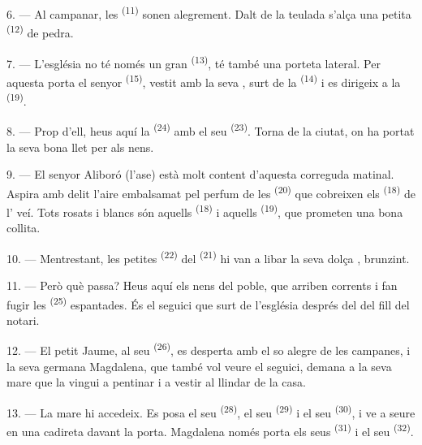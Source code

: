 6. --- Al campanar, les  \textsuperscript{(11)} sonen
alegrement. Dalt de la teulada s'alça una petita 
\textsuperscript{(12)} de pedra.

7. --- L'església no té només un gran  \textsuperscript{(13)}, té
també una porteta lateral. Per aquesta porta el senyor 
\textsuperscript{(15)}, vestit amb la seva , surt de la
 \textsuperscript{(14)} i es dirigeix a la 
\textsuperscript{(19)}.

8. --- Prop d'ell, heus aquí la  \textsuperscript{(24)} amb el seu
 \textsuperscript{(23)}. Torna de la ciutat, on ha portat la seva bona
llet per als nens.

\VUsaut{4.0mm}
\VUsaut{3.4mm}

9. --- El senyor Aliboró (l'ase) està molt content d'aquesta correguda
matinal. Aspira amb delit l'aire embalsamat pel perfum de les 
\textsuperscript{(20)} que cobreixen els 
\textsuperscript{(18)} de l' veí. Tots rosats i blancs són aquells
 \textsuperscript{(18)} i aquells 
\textsuperscript{(19)}, que prometen una bona collita.

10. --- Mentrestant, les petites  \textsuperscript{(22)} del
 \textsuperscript{(21)} hi van a libar la seva dolça ,
brunzint.

11. --- Però què passa? Heus aquí els nens del poble, que arriben corrents i fan
fugir les  \textsuperscript{(25)} espantades. És el seguici que surt
de l'església després del  del fill del notari.

12. --- El petit Jaume, al seu  \textsuperscript{(26)}, es
desperta amb el so alegre de les campanes, i la seva germana Magdalena, que també
vol veure el seguici, demana a la seva mare que la vingui a pentinar i a vestir
al llindar de la casa.

13. --- La mare hi accedeix. Es posa el seu 
\textsuperscript{(28)}, el seu  \textsuperscript{(29)} i el seu
 \textsuperscript{(30)}, i ve a seure en una cadireta davant la
porta. Magdalena només porta els seus  \textsuperscript{(31)} i el
seu  \textsuperscript{(32)}.

